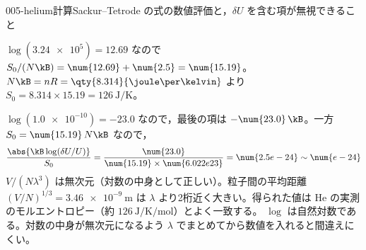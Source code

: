 \documentclass[uplatex,dvipdfmx,a4paper,11pt]{jsarticle}
\begin{document}
\begin{mondai}{005-helium}{計算}{Sackur--Tetrode の式の数値評価と，$\delta U$ を含む項が無視できること}
\begin{tadashii}
 $\log(\num{3.24e5})=\num{12.69}$ なので $S_{0}/(N\kB)=\num{12.69}+\num{2.5}=\num{15.19}$。$N\kB=nR=\qty{8.314}{\joule\per\kelvin}$ より $S_{0}=\num{8.314}\times\num{15.19}=\qty{126}{\joule\per\kelvin}$。

 $\log(\num{1.0e-10})=-\num{23.0}$ なので，最後の項は $-\num{23.0}\,\kB$。一方 $S_{0}=\num{15.19}\,N\kB$ なので，
\[\frac{\abs{\kB\log(\delta U/U)}}{S_{0}}=\frac{\num{23.0}}{\num{15.19}\times\num{6.022e23}}=\num{2.5e-24}\sim\num{e-24}\]
\kenzan $V/(N\lambda^{3})$ は無次元（対数の中身として正しい）。粒子間の平均距離 $(V/N)^{1/3}=\qty{3.46e-9}{\metre}$ は $\lambda$ より2桁近く大きい。得られた値は He の実測のモルエントロピー（約 $\qty{126}{\joule\per\kelvin\per\mole}$）とよく一致する。
\tsumazuki $\log$ は自然対数である。対数の中身が無次元になるよう $\lambda$ でまとめてから数値を入れると間違えにくい。
\end{tadashii}
\end{mondai}
\end{document}
